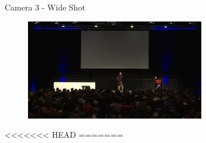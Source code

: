 \documentclass[aspectratio=169]{beamer}
\begin{document}
\begin{frame}{Camera 3 - Wide Shot}
	\begin{figure} 
		\centering
		\includegraphics[width=0.7\textwidth]{images/wide-shot.jpeg}
	\end{figure}
\end{frame}

<<<<<<< HEAD
=======
\end{document}

